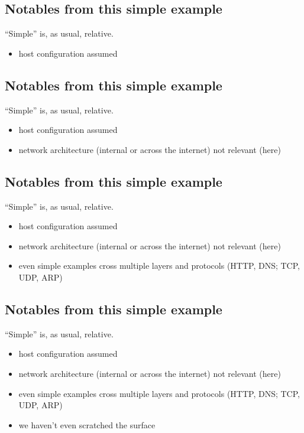 \documentclass[xga]{xdvislides}
\begin{document}
\subsection{Notables from this simple example}
``Simple'' is, as usual, relative.
\\

\begin{itemize}
	\item host configuration assumed
\end{itemize}

\subsection{Notables from this simple example}
``Simple'' is, as usual, relative.
\\

\begin{itemize}
	\item host configuration assumed
	\item network architecture (internal or across the internet) not
			relevant (here)
\end{itemize}

\subsection{Notables from this simple example}
``Simple'' is, as usual, relative.
\\

\begin{itemize}
	\item host configuration assumed
	\item network architecture (internal or across the internet) not
			relevant (here)
	\item even simple examples cross multiple layers and protocols
			(HTTP, DNS; TCP, UDP, ARP)
\end{itemize}

\subsection{Notables from this simple example}
``Simple'' is, as usual, relative.
\\

\begin{itemize}
	\item host configuration assumed
	\item network architecture (internal or across the internet) not
			relevant (here)
	\item even simple examples cross multiple layers and protocols
			(HTTP, DNS; TCP, UDP, ARP)
	\item we haven't even scratched the surface
\end{itemize}
\end{document}
